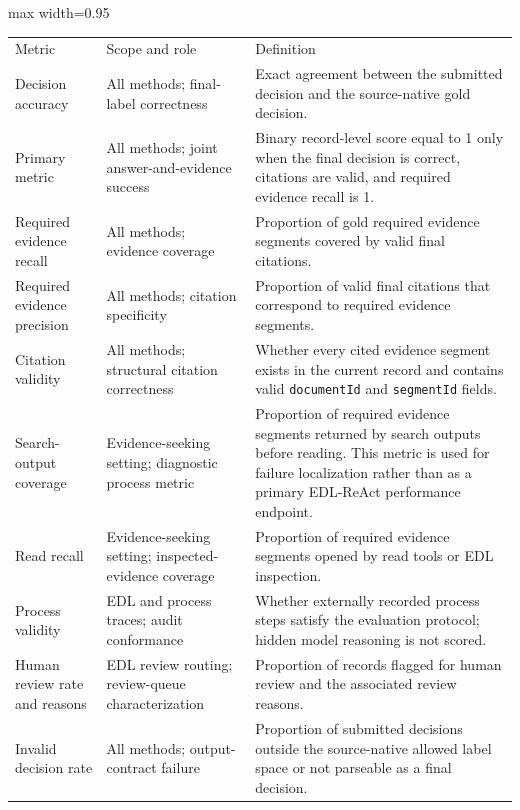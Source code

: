 \documentclass[
  8pt,
]{extarticle}
\begin{document}
\begin{center}
\begin{adjustbox}{max width=0.95\textwidth}
\begin{tabular}{@{}
lll@{}}
\toprule\noalign{}
Metric & Scope and role & Definition \\

Decision accuracy & All methods; final-label correctness & Exact
agreement between the submitted decision and the source-native gold
decision. \\
Primary metric & All methods; joint answer-and-evidence success & Binary
record-level score equal to 1 only when the final decision is correct,
citations are valid, and required evidence recall is 1. \\
Required evidence recall & All methods; evidence coverage & Proportion
of gold required evidence segments covered by valid final citations. \\
Required evidence precision & All methods; citation specificity &
Proportion of valid final citations that correspond to required evidence
segments. \\
Citation validity & All methods; structural citation correctness &
Whether every cited evidence segment exists in the current record and
contains valid \texttt{documentId} and \texttt{segmentId} fields. \\
Search-output coverage & Evidence-seeking setting; diagnostic process
metric & Proportion of required evidence segments returned by search
outputs before reading. This metric is used for failure localization
rather than as a primary EDL-ReAct performance endpoint. \\
Read recall & Evidence-seeking setting; inspected-evidence coverage &
Proportion of required evidence segments opened by read tools or EDL
inspection. \\
Process validity & EDL and process traces; audit conformance & Whether
externally recorded process steps satisfy the evaluation protocol;
hidden model reasoning is not scored. \\
Human review rate and reasons & EDL review routing; review-queue
characterization & Proportion of records flagged for human review and
the associated review reasons. \\
Invalid decision rate & All methods; output-contract failure &
Proportion of submitted decisions outside the source-native allowed
label space or not parseable as a final decision. \\
\bottomrule
\end{tabular}
\end{adjustbox}
\end{center}
\end{document}
